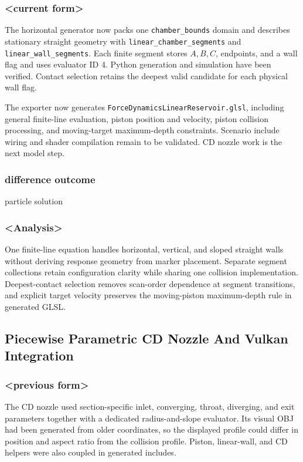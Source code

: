 \subsubsection{<current form>}

The horizontal generator now packs one \texttt{chamber\_bounds} domain and
describes stationary straight geometry with
\texttt{linear\_chamber\_segments} and \texttt{linear\_wall\_segments}.  Each
finite segment stores \(A,B,C\), endpoints, and a wall flag and uses evaluator
ID 4.  Python generation and simulation have been verified.  Contact selection
retains the deepest valid candidate for each physical wall flag.

The exporter now generates
\texttt{ForceDynamicsLinearReservoir.glsl}, including general finite-line
evaluation, piston position and velocity, piston collision processing, and
moving-target maximum-depth constraints.  Scenario include wiring and shader
compilation remain to be validated.  CD nozzle work is the next model step.

\subsubsection{difference outcome}

particle solution

\subsubsection{<Analysis>}

One finite-line equation handles horizontal, vertical, and sloped straight
walls without deriving response geometry from marker placement.  Separate
segment collections retain configuration clarity while sharing one collision
implementation.  Deepest-contact selection removes scan-order dependence at
segment transitions, and explicit target velocity preserves the moving-piston
maximum-depth rule in generated GLSL.

\subsection{Piecewise Parametric CD Nozzle And Vulkan Integration}

\subsubsection{<previous form>}

The CD nozzle used section-specific inlet, converging, throat, diverging, and
exit parameters together with a dedicated radius-and-slope evaluator.  Its
visual OBJ had been generated from older coordinates, so the displayed profile
could differ in position and aspect ratio from the collision profile.  Piston,
linear-wall, and CD helpers were also coupled in generated includes.

